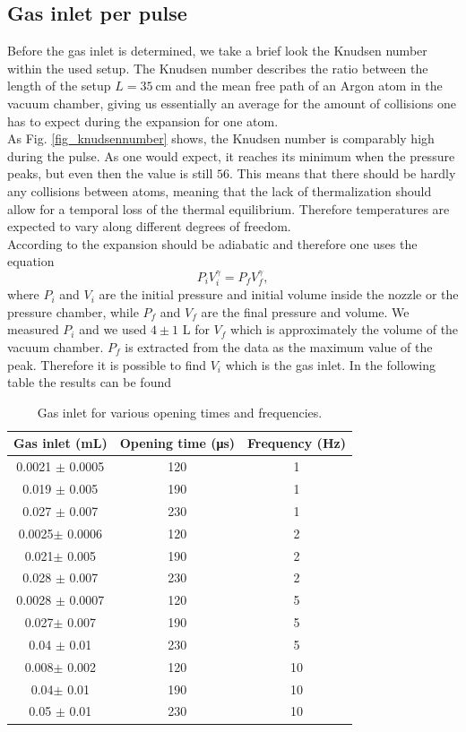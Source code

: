 \documentclass[a4paper,10pt]{article}
\begin{document}
\subsection{Gas inlet per pulse}
Before the gas inlet is determined, we take a brief look the Knudsen number within the used setup. The Knudsen number describes the ratio between the length of the setup $L = \SI{35}{\centi \m}$ and the mean free path of an Argon atom in the vacuum chamber, giving us essentially an average for the amount of collisions one has to expect during the expansion for one atom. 
\\
As Fig. \ref{fig_knudsennumber} shows, the Knudsen number is comparably high during the pulse. As one would expect, it reaches its minimum when the pressure peaks, but even then the value is still $56$. This means that there should be hardly any collisions between atoms, meaning that the lack of thermalization should allow for a temporal loss of the thermal equilibrium. Therefore temperatures are expected to vary along different degrees of freedom. 
\\
According to \cite{illinois} the expansion should be adiabatic and therefore one uses the equation 
\begin{equation}
	P_i V_i^\gamma = P_f V_f^\gamma,
\end{equation}
where $P_i$ and $V_i$ are the initial pressure and initial volume inside the nozzle or the pressure chamber, while $P_f$ and $V_f$ are the final pressure and volume. We measured $P_i$ and we used $4\pm 1$ L for $V_f$ which is approximately the volume of the vacuum chamber. $P_f$ is extracted from the data as the maximum value of the peak. Therefore it is possible to find $V_i$ which is the gas inlet. In the following table the results can be found
\begin{table}[H]
\centering
\caption{Gas inlet for various opening times and frequencies. }
\begin{tabular}{ccc} \toprule
    Gas inlet (mL) & Opening time (\si{\micro \s}) & Frequency (\si{\hertz}) \\ \midrule
0.0021 $\pm$ 0.0005 & 120& 1 \\
0.019 $\pm$ 0.005& 190& 1\\
0.027 $\pm$ 0.007 & 230& 1\\\midrule
0.0025$\pm$ 0.0006& 120& 2\\
0.021$\pm$ 0.005& 190& 2\\
0.028 $\pm$ 0.007& 230& 2\\\midrule
0.0028 $\pm$ 0.0007& 120& 5\\
0.027$\pm$ 0.007 & 190& 5\\
0.04 $\pm$ 0.01 & 230& 5\\\midrule
0.008$\pm$ 0.002& 120& 10\\
0.04$\pm$ 0.01& 190& 10\\
0.05 $\pm$ 0.01& 230& 10\\\bottomrule
\end{tabular}
\end{table}
\end{document}
